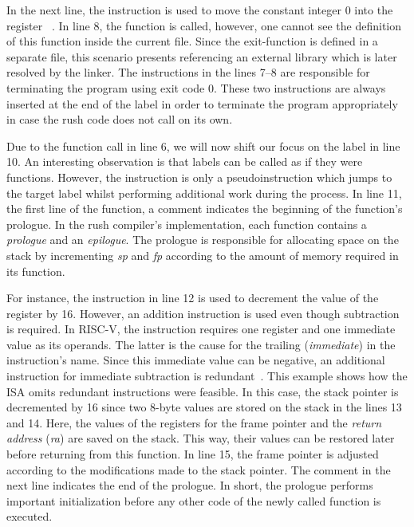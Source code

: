 In the next line, the  instruction is used to move the constant integer 0 into the register ~\cite[reference]{Patterson2017}.
In line 8, the  function is called, however, one cannot see the definition of this function inside the current file.
Since the exit-function is defined in a separate file, this scenario presents referencing an external library which is later resolved by the linker.
The instructions in the lines 7--8 are responsible for terminating the program using exit code 0.
These two instructions are always inserted at the end of the  label in order to terminate the program appropriately in case the rush code does not call  on its own.

Due to the function call in line 6, we will now shift our focus on the  label in line 10.
An interesting observation is that labels can be called as if they were functions.
However, the  instruction is only a pseudoinstruction which jumps to the target label whilst performing additional work during the process.
In line 11, the first line of the  function, a comment indicates the beginning of the function's prologue.
In the rush compiler's implementation, each function contains a \emph{prologue} and an \emph{epilogue}.
The prologue is responsible for allocating space on the stack by incrementing \emph{sp} and \emph{fp} according to the amount of memory required in its function.

For instance, the  instruction in line 12 is used to decrement the value of the  register by 16.
However, an addition instruction is used even though subtraction is required.
In RISC-V, the  instruction requires one register and one immediate value as its operands.
The latter is the cause for the trailing  (\emph{immediate}) in the instruction's name.
Since this immediate value can be negative, an additional instruction for immediate subtraction is redundant~\cite[reference]{Patterson2017}.
This example shows how the ISA omits redundant instructions were feasible.
In this case, the stack pointer is decremented by 16 since two 8-byte values are stored on the stack in the lines 13 and 14.
Here, the values of the registers for the frame pointer and the \emph{return address} (\emph{ra}) are saved on the stack.
This way, their values can be restored later before returning from this function.
In line 15, the frame pointer is adjusted according to the modifications made to the stack pointer.
The comment in the next line indicates the end of the prologue.
In short, the prologue performs important initialization before any other code of the newly called function is executed.

